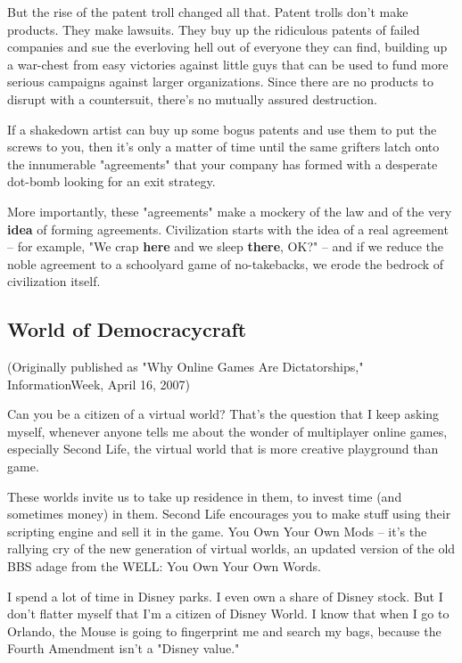 But the rise of the patent troll changed all that. Patent trolls
don't make products. They make lawsuits. They buy up the ridiculous
patents of failed companies and sue the everloving hell out of
everyone they can find, building up a war-chest from easy victories
against little guys that can be used to fund more serious campaigns
against larger organizations. Since there are no products to
disrupt with a countersuit, there's no mutually assured
destruction.

If a shakedown artist can buy up some bogus patents and use them to
put the screws to you, then it's only a matter of time until the
same grifters latch onto the innumerable "agreements" that your
company has formed with a desperate dot-bomb looking for an exit
strategy.

More importantly, these "agreements" make a mockery of the law and
of the very \textbf{idea} of forming agreements. Civilization
starts with the idea of a real agreement -- for example, "We crap
\textbf{here} and we sleep \textbf{there}, OK?" -- and if we reduce
the noble agreement to a schoolyard game of no-takebacks, we erode
the bedrock of civilization itself.

\subsection{World of Democracycraft}

(Originally published as "Why Online Games Are Dictatorships,"
InformationWeek, April 16, 2007)

Can you be a citizen of a virtual world? That's the question that I
keep asking myself, whenever anyone tells me about the wonder of
multiplayer online games, especially Second Life, the virtual world
that is more creative playground than game.

These worlds invite us to take up residence in them, to invest time
(and sometimes money) in them. Second Life encourages you to make
stuff using their scripting engine and sell it in the game. You Own
Your Own Mods -- it's the rallying cry of the new generation of
virtual worlds, an updated version of the old BBS adage from the
WELL: You Own Your Own Words.

I spend a lot of time in Disney parks. I even own a share of Disney
stock. But I don't flatter myself that I'm a citizen of Disney
World. I know that when I go to Orlando, the Mouse is going to
fingerprint me and search my bags, because the Fourth Amendment
isn't a "Disney value."

